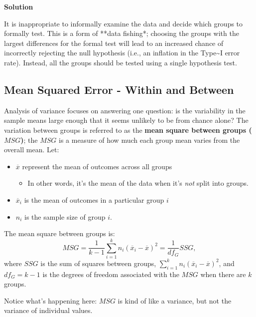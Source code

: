 \documentclass[
  letterpaper,
  DIV=11,
  numbers=noendperiod,
  oneside]{scrreprt}
\providecommand{\tightlist}{%
  \setlength{\itemsep}{0pt}\setlength{\parskip}{0pt}}\usepackage{longtable,booktabs,array}
\begin{document}
\textbf{Solution}

It is inappropriate to informally examine the data and decide which
groups to formally test. This is a form of **data fishing*; choosing the
groups with the largest differences for the formal test will lead to an
increased chance of incorrectly rejecting the null hypothesis (i.e., an
inflation in the Type\textasciitilde I error rate). Instead, all the
groups should be tested using a single hypothesis test.

\hypertarget{mean-squared-error---within-and-between}{%
\subsection{Mean Squared Error - Within and
Between}\label{mean-squared-error---within-and-between}}

Analysis of variance focuses on answering one question: is the
variability in the sample means large enough that it seems unlikely to
be from chance alone? The variation between groups is referred to as the
\textbf{mean square between groups (\(MSG\))}; the \(MSG\) is a measure
of how much each group mean varies from the overall mean. Let:

\begin{itemize}
\tightlist
\item
  \(\overline{x}\) represent the mean of outcomes across all groups

  \begin{itemize}
  \tightlist
  \item
    In other words, it's the mean of the data when it's \emph{not} split
    into groups.
  \end{itemize}
\item
  \(\overline{x}_i\) is the mean of outcomes in a particular group \(i\)
\item
  \(n_i\) is the sample size of group \(i\).
\end{itemize}

The mean square between groups is: \[
MSG = \frac{1}{k-1}\sum_{i=1}^{k} n_{i}\left(\overline{x}_{i} - \overline{x}\right)^{2} = \frac{1}{df_{G}}SSG,
\] where \(SSG\) is the sum of squares between groups,
\(\sum_{i=1}^{k} n_{i}\left(\overline{x}_{i} - \overline{x}\right)^{2}\),
and \(df_{G}=k-1\) is the degrees of freedom associated with the \(MSG\)
when there are \(k\) groups.

Notice what's happening here: \(MSG\) is kind of like a variance, but
not the variance of individual values.
\end{document}
